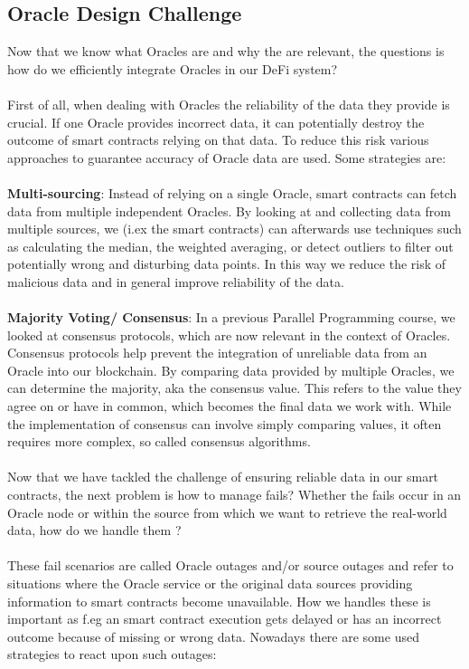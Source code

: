 \documentclass{article}
\begin{document}
\subsection{Oracle Design Challenge}
Now that we know what Oracles are and why the are relevant, the questions is how do we efficiently integrate Oracles in our DeFi system?\\
\\
First of all, when dealing with Oracles the reliability of the data they provide is crucial. If one Oracle provides incorrect data, it can potentially destroy the outcome of smart contracts relying on that data. To reduce this risk various approaches to guarantee accuracy of Oracle data are used. Some strategies are:\\
\\
\textbf{Multi-sourcing}: Instead of relying on a single Oracle, smart contracts can fetch data from multiple independent Oracles. By looking at and collecting data from multiple sources, we (i.ex the smart contracts) can afterwards use techniques such as calculating the median, the weighted averaging, or detect outliers to filter out potentially wrong and disturbing data points. In this way we reduce the risk of malicious data  and in general improve reliability of the data.\\
\\
\textbf{Majority Voting/ Consensus}: In a previous Parallel Programming course, we looked at consensus protocols, which are now relevant in the context of Oracles. Consensus protocols help prevent the integration of unreliable data from an Oracle into our blockchain. By comparing data provided by multiple Oracles, we can determine the majority, aka the consensus value. This refers to the value they agree on or have in common, which becomes the final data we work with. While the implementation of consensus can involve simply comparing values, it often requires more complex, so called consensus algorithms.\\\\Now that we have tackled the challenge of ensuring reliable data in our smart contracts, the next problem is how to manage fails? Whether the fails occur in an Oracle node or within the source from which we want to retrieve the real-world data, how do we handle them ?
\\\\These fail scenarios are called Oracle outages and/or source outages and refer to situations where the Oracle service or the original data sources providing information to smart contracts become unavailable. How we handles these is important as f.eg an smart contract execution gets delayed or has an incorrect outcome because of missing or wrong data. Nowadays there are some used strategies to react upon such outages:\\
\end{document}
